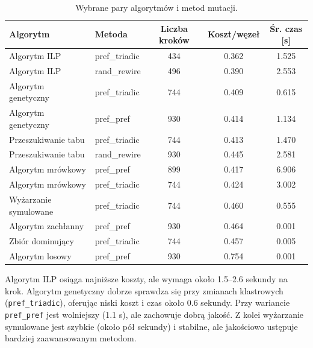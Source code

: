 \begin{table}[H]
  \centering
  \caption{Wybrane pary algorytmów i metod mutacji.}
  \label{tab:dyn-synth-selected-best}
  \begin{tabular}{llccc}
    \toprule
    \textbf{Algorytm}     & \textbf{Metoda} & \textbf{Liczba kroków} & \textbf{Koszt/węzeł} & \textbf{Śr. czas [s]} \\
    \midrule
    Algorytm ILP          & pref\_triadic   & 434                    & 0.362                & 1.525                 \\
    Algorytm ILP          & rand\_rewire    & 496                    & 0.390                & 2.553                 \\
    Algorytm genetyczny   & pref\_triadic   & 744                    & 0.409                & 0.615                 \\
    Algorytm genetyczny   & pref\_pref      & 930                    & 0.414                & 1.134                 \\
    Przeszukiwanie tabu   & pref\_triadic   & 744                    & 0.413                & 1.470                 \\
    Przeszukiwanie tabu   & rand\_rewire    & 930                    & 0.445                & 2.581                 \\
    Algorytm mrówkowy     & pref\_pref      & 899                    & 0.417                & 6.906                 \\
    Algorytm mrówkowy     & pref\_triadic   & 744                    & 0.424                & 3.002                 \\
    Wyżarzanie symulowane & pref\_triadic   & 744                    & 0.460                & 0.555                 \\
    Algorytm zachłanny    & pref\_pref      & 930                    & 0.464                & 0.001                 \\
    Zbiór dominujący      & pref\_triadic   & 744                    & 0.457                & 0.005                 \\
    Algorytm losowy       & pref\_pref      & 930                    & 0.754                & 0.001                 \\
    \bottomrule
  \end{tabular}
\end{table}

Algorytm ILP osiąga najniższe koszty, ale wymaga około 1.5--2.6 sekundy na krok. Algorytm genetyczny dobrze sprawdza się przy zmianach klastrowych (\texttt{pref\_triadic}), oferując niski koszt i czas około 0.6 sekundy. Przy wariancie \texttt{pref\_pref} jest wolniejszy (1.1 s), ale zachowuje dobrą jakość. Z kolei wyżarzanie symulowane jest szybkie (około pół sekundy) i stabilne, ale jakościowo ustępuje bardziej zaawansowanym metodom.


